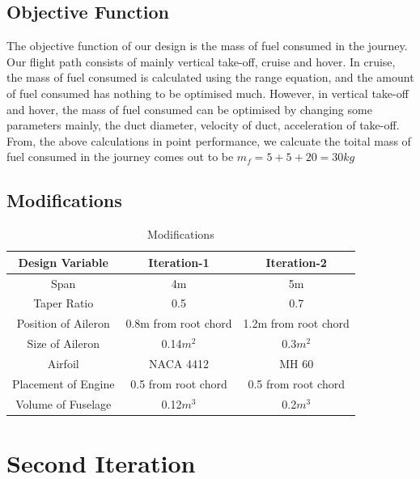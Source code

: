 \section{Objective Function}
The objective function of our design is the mass of fuel consumed in the journey. Our flight path consists of mainly vertical take-off, cruise and hover. 
In cruise, the mass of fuel consumed is calculated using the range equation, and the amount of fuel consumed has nothing to be optimised much. However, in vertical take-off and hover, the mass of fuel
consumed can be optimised by changing some parameters mainly, the duct diameter, velocity of duct, acceleration of take-off.
From, the above calculations in point performance, we calcuate the toital mass of fuel consumed in the journey comes out to be
$m_f = 5 + 5 + 20 = 30kg $ 
\section{Modifications}
\begin{table}[H]
\begin{center}
\begin{tabular}{ |c| c| c| }
\hline
 Design Variable & Iteration-1 & Iteration-2 \\ 
 \hline
 Span & 4m & 5m \\ 
 \hline
 Taper Ratio & 0.5 & 0.7 \\ 
 \hline
 Position of Aileron & 0.8m from root chord & 1.2m from root chord \\
 \hline
 Size of Aileron & 0.14$m^2$ & 0.3$m^2$ \\
 \hline
 Airfoil & NACA 4412 & MH 60 \\
 \hline
 Placement of Engine & 0.5 from root chord & 0.5 from root chord \\
 \hline
 Volume of Fuselage & 0.12$m^3$ & 0.2$m^3$ \\
 \hline
\end{tabular}
\end{center}
\caption{Modifications}
\end{table}

\chapter{Second Iteration}
